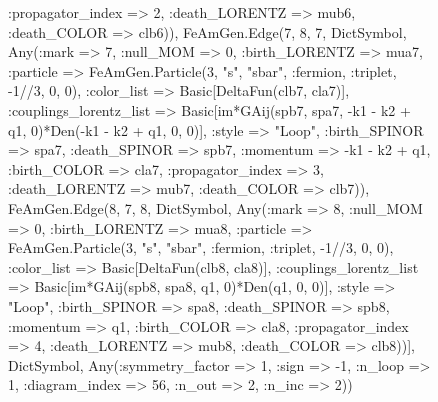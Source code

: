 \documentclass{revtex4}
\begin{document}
\begin{figure}[!htb]
\begin{center}
{:propagator_index => 2, :death_LORENTZ => mub6, :death_COLOR => clb6)), FeAmGen.Edge(7, 8, 7, Dict{Symbol, Any}(:mark => 7, :null_MOM => 0, :birth_LORENTZ => mua7, :particle => FeAmGen.Particle(3, "s", "sbar", :fermion, :triplet, -1//3, 0, 0), :color_list => Basic[DeltaFun(clb7, cla7)], :couplings_lorentz_list => Basic[im*GAij(spb7, spa7, -k1 - k2 + q1, 0)*Den(-k1 - k2 + q1, 0, 0)], :style => "Loop", :birth_SPINOR => spa7, :death_SPINOR => spb7, :momentum => -k1 - k2 + q1, :birth_COLOR => cla7, :propagator_index => 3, :death_LORENTZ => mub7, :death_COLOR => clb7)), FeAmGen.Edge(8, 7, 8, Dict{Symbol, Any}(:mark => 8, :null_MOM => 0, :birth_LORENTZ => mua8, :particle => FeAmGen.Particle(3, "s", "sbar", :fermion, :triplet, -1//3, 0, 0), :color_list => Basic[DeltaFun(clb8, cla8)], :couplings_lorentz_list => Basic[im*GAij(spb8, spa8, q1, 0)*Den(q1, 0, 0)], :style => "Loop", :birth_SPINOR => spa8, :death_SPINOR => spb8, :momentum => q1, :birth_COLOR => cla8, :propagator_index => 4, :death_LORENTZ => mub8, :death_COLOR => clb8))], Dict{Symbol, Any}(:symmetry_factor => 1, :sign => -1, :n_loop => 1, :diagram_index => 56, :n_out => 2, :n_inc => 2)) 
}
\end{center}
\end{figure}
\end{document}
